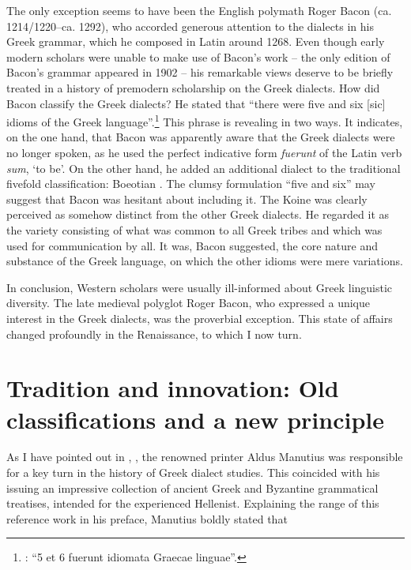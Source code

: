 {The only exception seems to have been the English polymath Roger Bacon (ca. 1214/1220–ca. 1292), who accorded generous attention to the dialects in his Greek grammar, which he composed in Latin around 1268. Even though early modern scholars were unable to make use of Bacon’s work – the only edition of Bacon’s grammar appeared in 1902 – his remarkable views deserve to be briefly treated in a history of premodern scholarship on the Greek dialects. How did Bacon classify the Greek dialects? He stated that “there were five and six [sic] idioms of the Greek language”.\footnote{\citet[26]{Bacon1902}: “5 et 6 fuerunt idiomata Graecae linguae”.} This phrase is revealing in two ways. It indicates, on the one hand, that Bacon was apparently aware that the Greek dialects were no longer spoken, as he used the perfect indicative form \textit{fuerunt} of the Latin verb \textit{sum}, ‘to be’. On the other hand, he added an additional dialect to the traditional fivefold classification: Boeotian \citep[27]{Bacon1902}. The clumsy formulation “five and six” may suggest that Bacon was hesitant about including it. The Koine was clearly perceived as somehow distinct from the other Greek dialects. He regarded it as the variety consisting of what was common to all Greek tribes and which was used for communication by all. It was, Bacon suggested, the core nature and substance of the Greek language, on which the other idioms were mere variations.

In conclusion, Western scholars were usually ill-informed about Greek linguistic diversity. The late medieval polyglot Roger Bacon, who expressed a unique interest in the Greek dialects, was the proverbial exception. This state of affairs changed profoundly in the Renaissance, to which I now turn.

\section{Tradition and innovation: Old classifications and a new principle}\label{sec:2.6}

As I have pointed out in , , the renowned printer Aldus Manutius was responsible for a key turn in the history of Greek dialect studies. This coincided with his issuing an impressive collection of ancient Greek and Byzantine grammatical treatises, intended for the experienced Hellenist. Explaining the range of this reference work in his preface, Manutius boldly stated that

}
